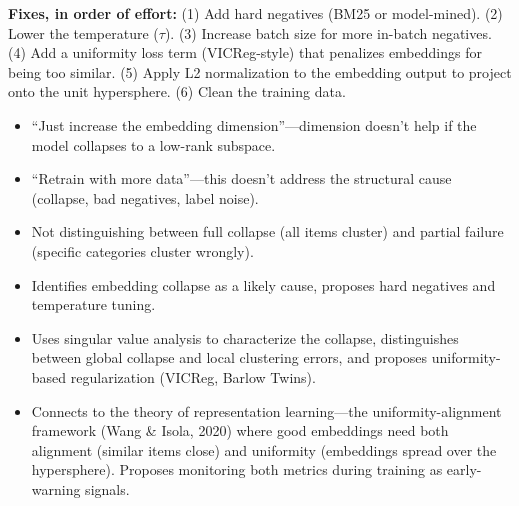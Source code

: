 \begin{interviewq}
\textbf{Fixes, in order of effort:} (1) Add hard negatives (BM25 or model-mined). (2) Lower the temperature ($\tau$). (3) Increase batch size for more in-batch negatives. (4) Add a uniformity loss term (VICReg-style) that penalizes embeddings for being too similar. (5) Apply L2 normalization to the embedding output to project onto the unit hypersphere. (6) Clean the training data.

\redflags
\begin{itemize}
    \item ``Just increase the embedding dimension''---dimension doesn't help if the model collapses to a low-rank subspace.
    \item ``Retrain with more data''---this doesn't address the structural cause (collapse, bad negatives, label noise).
    \item Not distinguishing between full collapse (all items cluster) and partial failure (specific categories cluster wrongly).
\end{itemize}


\goodgreat
\begin{itemize}
    \item {} Identifies embedding collapse as a likely cause, proposes hard negatives and temperature tuning.
    \item {} Uses singular value analysis to characterize the collapse, distinguishes between global collapse and local clustering errors, and proposes uniformity-based regularization (VICReg, Barlow Twins).
    \item {} Connects to the theory of representation learning---the uniformity-alignment framework (Wang \& Isola, 2020) where good embeddings need both alignment (similar items close) and uniformity (embeddings spread over the hypersphere). Proposes monitoring both metrics during training as early-warning signals.
\end{itemize}

\end{interviewq}



